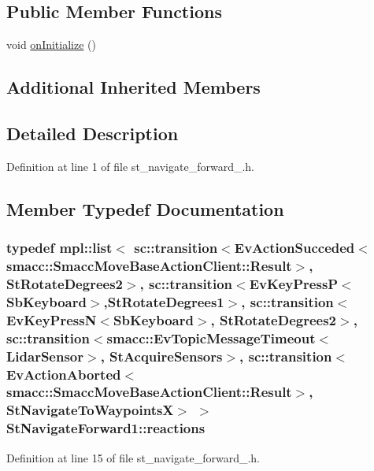 \subsection*{Public Member Functions}
\begin{DoxyCompactItemize}
\item 
void \hyperlink{structStNavigateForward1_a49134dde57b432385db0ba37201434e0}{on\+Initialize} ()
\end{DoxyCompactItemize}
\subsection*{Additional Inherited Members}


\subsection{Detailed Description}


Definition at line 1 of file st\+\_\+navigate\+\_\+forward\+\_.\+h.



\subsection{Member Typedef Documentation}
\subsubsection[{\texorpdfstring{reactions}{reactions}}]{\setlength{\rightskip}{0pt plus 5cm}typedef mpl\+::list$<$ sc\+::transition$<$Ev\+Action\+Succeded$<$smacc\+::\+Smacc\+Move\+Base\+Action\+Client\+::\+Result$>$, {\bf St\+Rotate\+Degrees2}$>$, sc\+::transition$<$Ev\+Key\+PressP$<$Sb\+Keyboard$>$,{\bf St\+Rotate\+Degrees1}$>$, sc\+::transition$<$Ev\+Key\+PressN$<$Sb\+Keyboard$>$, {\bf St\+Rotate\+Degrees2}$>$, sc\+::transition$<${\bf smacc\+::\+Ev\+Topic\+Message\+Timeout}$<${\bf Lidar\+Sensor}$>$, {\bf St\+Acquire\+Sensors}$>$, sc\+::transition$<$Ev\+Action\+Aborted$<$smacc\+::\+Smacc\+Move\+Base\+Action\+Client\+::\+Result$>$, {\bf St\+Navigate\+To\+WaypointsX}$>$ $>$ {\bf St\+Navigate\+Forward1\+::reactions}}\hypertarget{structStNavigateForward1_aaa6938a29c73fbed24e45de85b5d9d25}{}\label{structStNavigateForward1_aaa6938a29c73fbed24e45de85b5d9d25}


Definition at line 15 of file st\+\_\+navigate\+\_\+forward\+\_.\+h.



